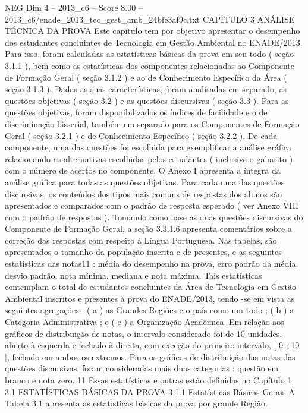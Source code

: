 \begin{textsample}{NEG Dim 4 – 2013\_c6 – Score 8.00 – 2013\_c6/enade\_2013\_tec\_gest\_amb\_24bfe3af9c.txt}  \label{ex:f4_neg_314}
CAPÍTULO 3 ANÁLISE TÉCNICA DA PROVA Este capítulo tem por objetivo apresentar o desempenho dos estudantes concluintes de Tecnologia em Gestão Ambiental no ENADE/2013.
Para isso, foram calculadas as estatísticas básicas da prova em seu todo ( seção 3.1.1 ), bem como as estatísticas dos componentes relacionadas ao Componente de Formação Geral ( seção 3.1.2 ) e ao de Conhecimento Específico da Área ( seção 3.1.3 ).
Dadas as suas características, foram analisadas em separado, as questões objetivas ( seção 3.2 ) e as questões discursivas ( seção 3.3 ).
Para as questões objetivas, foram disponibilizados os índices de facilidade e o de discriminação bisserial, também em separado para os Componentes de Formação Geral ( seção 3.2.1 ) e de Conhecimento Específico ( seção 3.2.2 ).
De cada componente, uma das questões foi escolhida para exemplificar a análise gráfica relacionando as alternativas escolhidas pelos estudantes ( inclusive o gabarito ) com o número de acertos no componente.
O Anexo I apresenta a íntegra da análise gráfica para todas as questões objetivas.
Para cada uma das questões discursivas, os conteúdos dos tipos mais comuns de respostas dos alunos são apresentados e comparados com o padrão de resposta esperado ( ver Anexo VIII com o padrão de respostas ).
Tomando como base as duas questões discursivas do Componente de Formação Geral, a seção 3.3.1.6 apresenta comentários sobre a correção das respostas com respeito à Língua Portuguesa.
Nas tabelas, são apresentados o tamanho da população inscrita e de presentes, e as seguintes estatísticas das notas11 : média do desempenho na prova, erro padrão da média, desvio padrão, nota mínima, mediana e nota máxima.
Tais estatísticas contemplam o total de estudantes concluintes da Área de Tecnologia em Gestão Ambiental inscritos e presentes à prova do ENADE/2013, tendo -se em vista as seguintes agregações : ( a ) as Grandes Regiões e o país como um todo ; ( b ) a Categoria Administrativa ; e ( c ) a Organização Acadêmica.
Em relação aos gráficos de distribuição de notas, o intervalo considerado foi de 10 unidades, aberto à esquerda e fechado à direita, com exceção do primeiro intervalo, [ 0 ; 10 ], fechado em ambos os extremos.
Para os gráficos de distribuição das notas das questões discursivas, foram consideradas mais duas categorias : questão em branco e nota zero. 11 Essas estatísticas e outras estão definidas no Capítulo 1. 3.1 ESTATÍSTICAS BÁSICAS DA PROVA 3.1.1 Estatísticas Básicas Gerais A Tabela 3.1 apresenta as estatísticas básicas da prova por grande Região.

\end{textsample}

